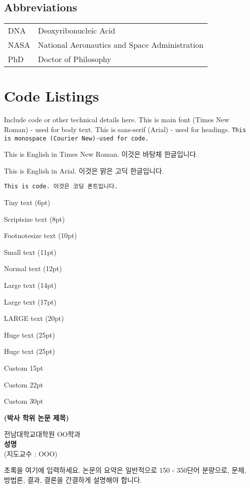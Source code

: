 \section*{Abbreviations}
\begin{tabular}{ll}
DNA & Deoxyribonucleic Acid \\
NASA & National Aeronautics and Space Administration \\
PhD & Doctor of Philosophy \\
\end{tabular}

\chapter{Code Listings}

Include code or other technical details here. This is main font (Times New Roman) - used for body text.
\textsf{This is sans-serif (Arial) - used for headings.}	
\texttt{This is monospace (Courier New)-used for code.}

This is English in Times New Roman. 이것은 바탕체 한글입니다.

\textsf{This is English in Arial. 이것은 맑은 고딕 한글입니다.}

\texttt{This is code. 이것은 코딩 폰트입니다.}

{\tiny Tiny text (6pt)}

{\scriptsize Scriptsize text (8pt)}

{\footnotesize Footnotesize text (10pt)}

{\small Small text (11pt)}

\normalsize Normal text (12pt)

{\large Large text (14pt)}

{\Large Large text (17pt)}

{\LARGE LARGE text (20pt)}

{\huge Huge text (25pt)}

{\Huge Huge text (25pt)}

{\fontsize{15pt}{18pt}\selectfont Custom 15pt}

{\fontsize{22pt}{26pt}\selectfont Custom 22pt}

{\fontsize{30pt}{36pt}\selectfont Custom 30pt}

\newpage	
\cleardoublepage
{}
{}
\vspace*{0cm}
\begin{center}
{\LARGE\bfseries (박사 학위 논문 제목) \par}    
{\large	전남대학교대학원 OO학과}\\[1\baselineskip]
{\Large {\bfseries 성명 }\\[1\baselineskip] (지도교수 : OOO)}\\[3\baselineskip]
\end{center}

{\Large {}\par}
초록을 여기에 입력하세요. 논문의 요약은 일반적으로 150 - 350단어 분량으로, 문제, 방법론, 결과, 결론을 간결하게 설명해야 합니다.
